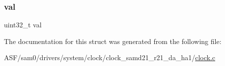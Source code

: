 \mbox{\label{struct__system__clock__dfll__config_a97ad06b300d95ba1d023dcb1e825335f}} 
\subsubsection{\texorpdfstring{val}{val}}
{\footnotesize\ttfamily uint32\+\_\+t val}



The documentation for this struct was generated from the following file\+:\begin{DoxyCompactItemize}
\item 
A\+S\+F/sam0/drivers/system/clock/clock\+\_\+samd21\+\_\+r21\+\_\+da\+\_\+ha1/\mbox{\hyperlink{clock_8c}{clock.\+c}}\end{DoxyCompactItemize}
